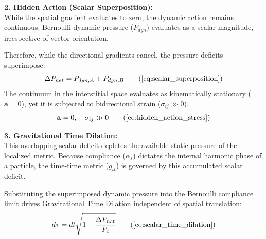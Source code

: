 \textbf{2. Hidden Action (Scalar Superposition):} \\
While the spatial gradient evaluates to zero, the dynamic action remains continuous. Bernoulli dynamic pressure ($P_{dyn}$) evaluates as a scalar magnitude, irrespective of vector orientation. %

Therefore, while the directional gradients cancel, the pressure deficits superimpose: %
\begin{equation}
    \Delta P_{net} = P_{dyn,A} + P_{dyn,B} \tag{\ref{eq:scalar_superposition}}
\end{equation}
The continuum in the interstitial space evaluates as kinematically stationary ($\mathbf{a} = 0$), yet it is subjected to bidirectional strain ($\sigma_{ij} \gg 0$). %
\begin{equation}
    \mathbf{a} = 0, \quad \sigma_{ij} \gg 0 \tag{\ref{eq:hidden_action_stress}}
\end{equation}

\textbf{3. Gravitational Time Dilation:} \\
This overlapping scalar deficit depletes the available static pressure of the localized metric. Because compliance ($\alpha_s$) dictates the internal harmonic phase of a particle, the time-time metric ($g_{tt}$) is governed by this accumulated scalar deficit. %

Substituting the superimposed dynamic pressure into the Bernoulli compliance limit drives Gravitational Time Dilation independent of spatial translation: %
\begin{equation}
    d\tau = dt \sqrt{1 - \frac{\Delta P_{net}}{P_c}} \tag{\ref{eq:scalar_time_dilation}}
\end{equation}


